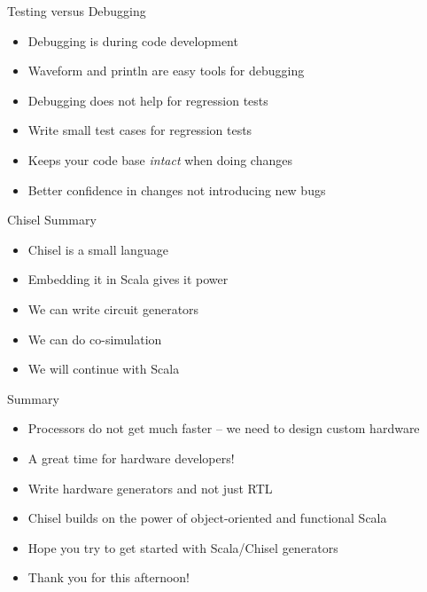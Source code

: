 \begin{frame}[fragile]{Testing versus Debugging}
\begin{itemize}
\item Debugging is during code development
\item Waveform and println are easy tools for debugging
\item Debugging does not help for regression tests
\item Write small test cases for regression tests
\item Keeps your code base \emph{intact} when doing changes
\item Better confidence in changes not introducing new bugs
\end{itemize}
\end{frame}



\begin{frame}[fragile]{Chisel Summary}
\begin{itemize}
\item Chisel is a small language
\item Embedding it in Scala gives it power
\item We can write circuit generators
\item We can do co-simulation
\item We will continue with Scala
\end{itemize}
\end{frame}


%
%
%
%



\begin{frame}[fragile]{Summary}
\begin{itemize}
\item Processors do not get much faster -- we need to design custom hardware
\item A great time for hardware developers!
\item Write hardware generators and not just RTL
\item Chisel builds on the power of object-oriented and functional Scala
\item Hope you try to get started with Scala/Chisel generators
\item Thank you for this afternoon!
\end{itemize}
\end{frame}

